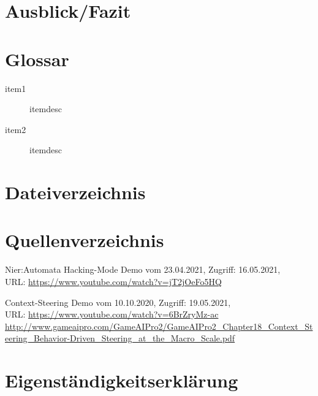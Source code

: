 \documentclass[a4paper,10pt,ngerman,fontsize=12pt]{scrreprt}
\begin{document}
\chapter{Ausblick/Fazit}
\lipsum[3]





\chapter{Glossar}
\begin{description}
\item[item1] itemdesc
\item[item2] itemdesc
\end{description}




\chapter{Dateiverzeichnis}




\chapter{Quellenverzeichnis}

\begin{thebibliography}{999}

 Nier:Automata Hacking-Mode Demo vom 23.04.2021,  Zugriff:  16.05.2021, \\ URL:
\url{https://www.youtube.com/watch?v=jT2jOeFo5HQ}

 Context-Steering Demo vom 10.10.2020,  Zugriff:  19.05.2021, \\ URL:
\url{https://www.youtube.com/watch?v=6BrZryMz-ac}
\url{http://www.gameaipro.com/GameAIPro2/GameAIPro2_Chapter18_Context_Steering_Behavior-Driven_Steering_at_the_Macro_Scale.pdf}

\end{thebibliography}
    




\chapter{Eigenständigkeitserklärung}
\end{document}
